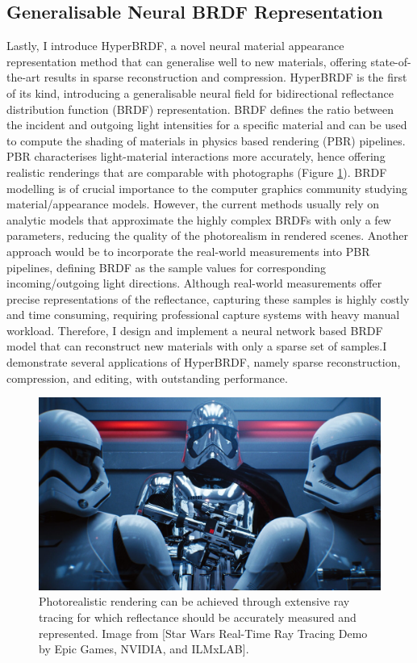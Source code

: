 \subsection{Generalisable Neural BRDF Representation}
Lastly, I introduce HyperBRDF, a novel neural material appearance representation method that can generalise well to new materials, offering state-of-the-art results in sparse reconstruction and compression. HyperBRDF is the first of its kind, introducing a generalisable neural field for bidirectional reflectance distribution function (BRDF) representation. BRDF defines the ratio between the incident and outgoing light intensities for a specific material and can be used to compute the shading of materials in physics based rendering (PBR) pipelines. PBR characterises light-material interactions more accurately, hence offering realistic renderings that are comparable with photographs (Figure \ref{fig:brdf-intro}). BRDF modelling is of crucial importance to the computer graphics community studying material/appearance models. However, the current methods usually rely on analytic models that approximate the highly complex BRDFs with only a few parameters, reducing the quality of the photorealism in rendered scenes. Another approach would be to incorporate the real-world measurements into PBR pipelines, defining BRDF as the sample values for corresponding incoming/outgoing light directions. Although real-world measurements offer precise representations of the reflectance, capturing these samples is highly costly and time consuming, requiring professional capture systems with heavy manual workload. Therefore, I design and implement a neural network based BRDF model that can reconstruct new materials with only a sparse set of samples.I demonstrate several applications of HyperBRDF, namely sparse reconstruction, compression, and editing, with outstanding performance. 

\begin{figure}[ht]
  \centering

    \includegraphics[width=\linewidth]{Images/StarWars-RayTracing.jpeg}

   \caption{Photorealistic rendering can be achieved through extensive ray tracing for which reflectance should be accurately measured and represented. Image from [Star Wars Real-Time Ray Tracing Demo by Epic Games, NVIDIA, and ILMxLAB].}
   \label{fig:brdf-intro}
\end{figure}



